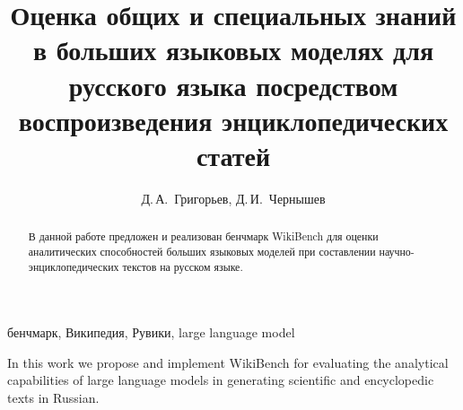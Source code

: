 \documentclass{article}
\theoremstyle{definition}
\theoremstyle{plain}
\begin{document}


\title{Оценка общих и специальных знаний в больших языковых моделях для русского языка посредством воспроизведения энциклопедических статей}

\author{Д.\,А.~Григорьев\Addressmark[1]\Emailmark[1], Д.\,И.~Чернышев\Addressmark[1]\Emailmark[2]}











\maketitle


\begin{abstract}
В данной работе предложен и реализован бенчмарк WikiBench для оценки аналитических способностей больших языковых моделей при составлении научно-энциклопедических текстов на русском языке. 
\end{abstract}

\begin{keywords}
бенчмарк, Википедия, Рувики, large language model
\end{keywords}

\begin{altabstract}
In this work we propose and implement WikiBench for evaluating the analytical capabilities of large language models in generating scientific and encyclopedic texts in Russian.
\end{altabstract}
\end{document}

